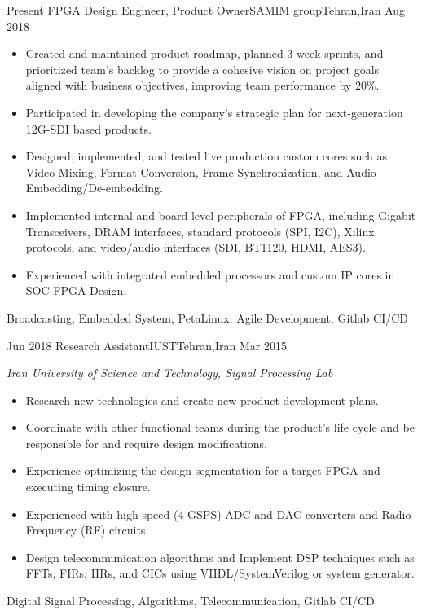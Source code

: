 
\begin{experiences}
	\experience
	{Present} {FPGA Design Engineer, Product Owner}{SAMIM group}{Tehran,Iran}
	{Aug 2018} {
		\begin{itemize}
			\item Created and maintained product roadmap, planned 3-week sprints,
			      and prioritized team's backlog to provide a cohesive vision on
			      project goals aligned with business objectives, improving team
			      performance by $20\%$.
			\item Participated in developing the company's strategic plan for
			      next-generation 12G-SDI based products.
			\item Designed, implemented, and tested live production custom cores
			      such as Video Mixing, Format Conversion, Frame Synchronization,
			      and Audio Embedding/De-embedding.
			\item Implemented internal and board-level peripherals of FPGA, including
			      Gigabit Transceivers, DRAM interfaces,
			      standard protocols (SPI, I2C), Xilinx protocols, and video/audio
			      interfaces (SDI, BT1120, HDMI, AES3).
			\item Experienced with integrated embedded processors and custom IP cores
			      in SOC FPGA Design.
		\end{itemize}
	}
	{Broadcasting, Embedded System, PetaLinux, Agile Development, Gitlab CI/CD}
	
	\emptySeparator
	
	\experience
	{Jun 2018} {Research Assistant}{IUST}{Tehran,Iran}
	{Mar 2015} {
		\emph{Iran University of Science and Technology, Signal Processing Lab}
		\begin{itemize}
			\item Research new technologies and create new product development plans.
			\item Coordinate with other functional teams during the product's life
			      cycle and be responsible for and require design modifications.
			\item Experience optimizing the design segmentation for a target FPGA
			      and executing timing closure.
			\item Experienced with high-speed ($4$ GSPS) ADC and DAC converters
			      and Radio Frequency (RF) circuits.
			\item Design telecommunication algorithms and Implement DSP techniques
			      such as FFTs, FIRs, IIRs, and CICs using VHDL/SystemVerilog
			      or system generator.
		\end{itemize}
	}
	{Digital Signal Processing, Algorithms, Telecommunication, Gitlab CI/CD}
	

\end{experiences}
